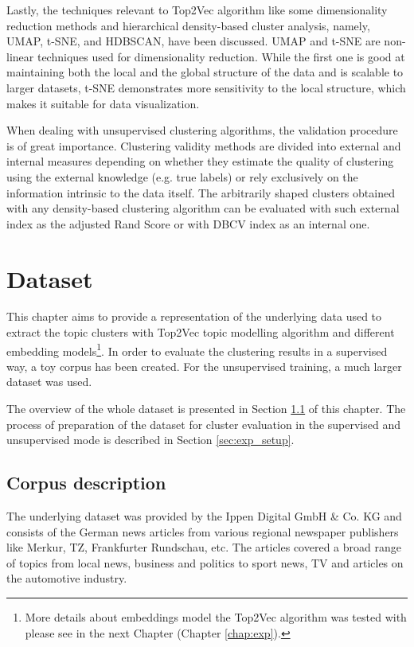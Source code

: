 \documentclass[fontsize=12pt,a4paper,twoside,openany]{scrbook}
\begin{document}
Lastly, the techniques relevant to Top2Vec algorithm like some dimensionality reduction methods and hierarchical density-based cluster analysis, namely,  UMAP, t-SNE, and HDBSCAN, have been discussed. UMAP and t-SNE are non-linear techniques used for dimensionality reduction. While the first one is good at maintaining both the local and the global structure of the data and is scalable to larger datasets, t-SNE demonstrates more sensitivity to the local structure, which makes it suitable for data visualization. 

When dealing with unsupervised clustering algorithms, the validation procedure is of great importance. Clustering validity methods are divided into external and internal measures depending on whether they estimate the quality of clustering using the external knowledge (e.g. true labels) or rely exclusively on the information intrinsic to the data itself. The arbitrarily shaped clusters obtained with any density-based clustering algorithm can be evaluated with such external index as the adjusted Rand Score or with DBCV index as an internal one.

\chapter{Dataset}
\label{chap:dataset}
This chapter aims to provide a representation of the underlying data used to extract the topic clusters with Top2Vec topic modelling algorithm and different embedding models\footnote{More details about embeddings model the Top2Vec algorithm was tested with please see in the next Chapter (Chapter \ref{chap:exp}).}. In order to evaluate the clustering results in a supervised way, a toy corpus has been created. For the unsupervised training, a much larger dataset was used. 

The overview of the whole dataset is presented in Section \ref{sec:corp_exploration} of this chapter. The process of preparation of the dataset for cluster evaluation in the supervised and unsupervised mode is described in Section \ref{sec:exp_setup}.

\section{Corpus description}
\label{sec:corp_exploration}

The underlying dataset was provided by the Ippen Digital GmbH \& Co. KG and consists of the German news articles from various regional newspaper publishers like Merkur, TZ, Frankfurter Rundschau, etc. The articles covered a broad range of topics from local news, business and politics to sport news, TV and articles on the automotive industry.
\end{document}
